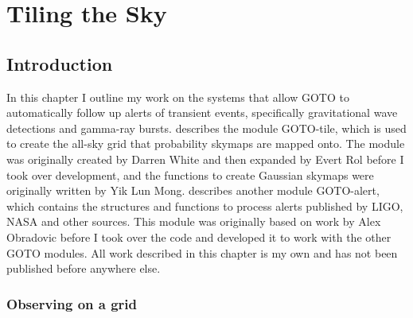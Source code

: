 \chapter{Tiling the Sky}
\label{chap:tiling}
\chaptoc{}


\newpage
\section{Introduction}
\label{sec:tiling_intro}
\begin{colsection}


\begin{colsection}


In this chapter I outline my work on the systems that allow GOTO to automatically follow up alerts of transient events, specifically gravitational wave detections and gamma-ray bursts.  describes the  module GOTO-tile, which is used to create the all-sky grid that probability skymaps are mapped onto. The module was originally created by Darren White and then expanded by Evert Rol before I took over development, and the functions to create Gaussian skymaps were originally written by Yik Lun Mong.  describes another  module GOTO-alert, which contains the structures and functions to process alerts published by LIGO, NASA and other sources. This module was originally based on work by Alex Obradovic before I took over the code and developed it to work with the other GOTO modules. All work described in this chapter is my own and has not been published before anywhere else.

\end{colsection}


\subsection{Observing on a grid}
\label{sec:on_grid}
\begin{colsection}


\end{colsection}


\end{colsection}

